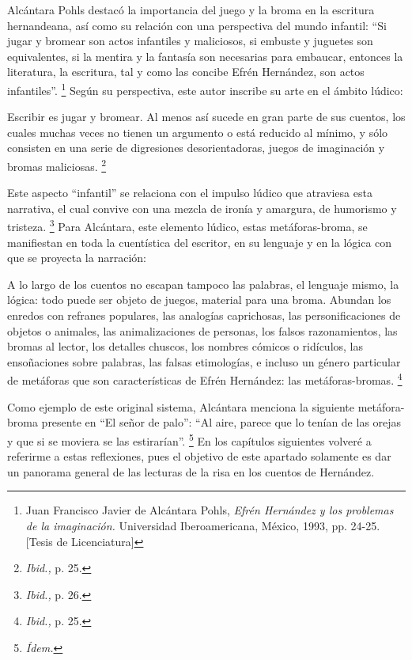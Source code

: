 \documentclass[14pt,twoside,final]{extbook} %
\let\oldfootnote\footnote
\renewcommand\footnote[1]{%
\oldfootnote{\hspace{1mm}#1}}
\begin{document}
Alcántara Pohls destacó la importancia del juego y la broma en la escritura hernandeana, así como su relación con una perspectiva del mundo infantil: ``Si jugar y bromear son actos infantiles y maliciosos, si embuste y juguetes son equivalentes, si la mentira y la fantasía son necesarias para embaucar, entonces la literatura, la escritura, tal y como las concibe Efrén Hernández, son actos infantiles''.\footnote{Juan Francisco Javier de Alcántara Pohls, \emph{Efrén Hernández y los problemas de la imaginación.} Universidad Iberoamericana, México, 1993, pp. 24-25. [Tesis de Licenciatura]} Según su perspectiva, este autor inscribe su arte en el ámbito lúdico: 
\begin{quoting}
Escribir es jugar y bromear. Al menos así sucede en gran parte de sus cuentos, los cuales muchas veces no tienen un argumento o está reducido al mínimo, y sólo consisten en una serie de digresiones desorientadoras, juegos de imaginación y bromas maliciosas.\footnote{\emph{Ibid.,} p. 25.}
\end{quoting}
Este aspecto ``infantil'' se relaciona con el impulso lúdico que atraviesa esta narrativa, el cual convive con una mezcla de ironía y amargura, de humorismo y tristeza.\footnote{\emph{Ibid.,} p. 26.} Para Alcántara, este elemento lúdico, estas \mbox{metáforas-broma}, se manifiestan en toda la cuentística del escritor, en su lenguaje y en la lógica con que se proyecta la narración:
\begin{quoting}
A lo largo de los cuentos no escapan tampoco las palabras, el lenguaje mismo, la lógica: todo puede ser objeto de juegos, material para una broma. Abundan los enredos con refranes populares, las analogías caprichosas, las personificaciones de objetos o animales, las animalizaciones de personas, los falsos razonamientos, las bromas al lector, los detalles chuscos, los nombres cómicos o ridículos, las ensoñaciones sobre palabras, las falsas etimologías, e incluso un género particular de metáforas que son características de Efrén Hernández: las metáforas-bromas.\footnote{\emph{Ibid.,} p. 25.}
\end{quoting}
Como ejemplo de este original sistema, Alcántara menciona la siguiente metáfora-broma presente en ``El señor de palo'': ``Al aire, parece que lo tenían de las orejas y que si se moviera se las estirarían''.\footnote{\em Ídem.} En los capítulos siguientes volveré a referirme a estas reflexiones, pues el objetivo de este apartado solamente es dar un panorama general de las lecturas de la risa en los cuentos de Hernández.
\end{document}

